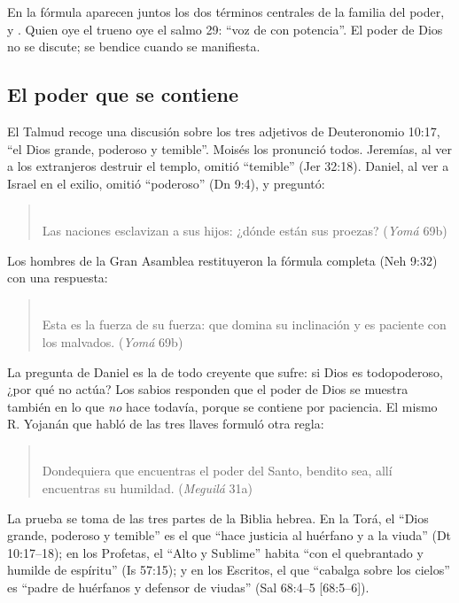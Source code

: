 En la fórmula aparecen juntos los dos términos centrales de la familia del poder,  y . Quien oye el trueno oye el salmo 29: ``voz de \SENOR{} con potencia''. El poder de Dios no se discute; se bendice cuando se manifiesta.

\subsection{El poder que se contiene}

El Talmud recoge una discusión sobre los tres adjetivos de Deuteronomio 10:17, ``el Dios grande, poderoso y temible''. Moisés los pronunció todos. Jeremías, al ver a los extranjeros destruir el templo, omitió ``temible'' (Jer 32:18). Daniel, al ver a Israel en el exilio, omitió ``poderoso'' (Dn 9:4), y preguntó:

\begin{quote}\small
{}\\
Las naciones esclavizan a sus hijos: ¿dónde están sus proezas? (\emph{Yomá} 69b)
\end{quote}

Los hombres de la Gran Asamblea restituyeron la fórmula completa (Neh 9:32) con una respuesta:

\begin{quote}\small
{}\\
Esta es la fuerza de su fuerza: que domina su inclinación y es paciente con los malvados. (\emph{Yomá} 69b)
\end{quote}

La pregunta de Daniel es la de todo creyente que sufre: si Dios es todopoderoso, ¿por qué no actúa? Los sabios responden que el poder de Dios se muestra también en lo que \emph{no} hace todavía, porque se contiene por paciencia. El mismo R. Yojanán que habló de las tres llaves formuló otra regla:

\begin{quote}\small
{}\\
Dondequiera que encuentras el poder del Santo, bendito sea, allí encuentras su humildad. (\emph{Meguilá} 31a)
\end{quote}

La prueba se toma de las tres partes de la Biblia hebrea. En la Torá, el ``Dios grande, poderoso y temible'' es el que ``hace justicia al huérfano y a la viuda'' (Dt 10:17--18); en los Profetas, el ``Alto y Sublime'' habita ``con el quebrantado y humilde de espíritu'' (Is 57:15); y en los Escritos, el que ``cabalga sobre los cielos'' es ``padre de huérfanos y defensor de viudas'' (Sal 68:4--5 [68:5--6]).

